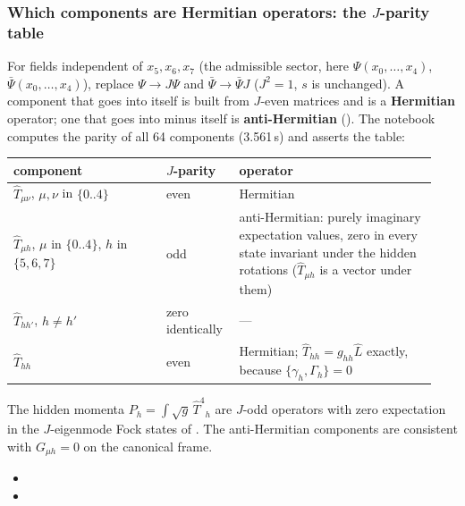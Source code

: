 \subsubsection{Which components are Hermitian operators: the \texorpdfstring{$J$}{J}-parity table}
\label{sec:3.6.5}

For fields independent of $x_5,x_6,x_7$ (the admissible sector, here $\Psi(x_0,\dots,x_4)$,
$\bar\Psi(x_0,\dots,x_4)$), replace $\Psi\to J\Psi$ and $\bar\Psi\to\bar\Psi J$ ($J^2=1$, $s$ is
unchanged). A component that goes into itself is built from $J$-even matrices and is a
\textbf{Hermitian} operator; one that goes into minus itself is \textbf{anti-Hermitian}
(). The notebook computes the parity of all 64 components (3.561\,s) and asserts the
table:

{\small
\begin{longtable}{@{}p{0.34\linewidth}p{0.16\linewidth}p{0.44\linewidth}@{}}
\toprule
\raggedright component & \raggedright $J$-parity & \raggedright operator \tabularnewline
\midrule
\endhead
\raggedright $\hat T_{\mu\nu}$, $\mu,\nu$ in $\{0..4\}$ & \raggedright even & \raggedright Hermitian \tabularnewline
\raggedright $\hat T_{\mu h}$, $\mu$ in $\{0..4\}$, $h$ in $\{5,6,7\}$ & \raggedright odd & \raggedright anti-Hermitian: purely imaginary expectation values, zero in every state invariant under the hidden rotations ($\hat T_{\mu h}$ is a vector under them) \tabularnewline
\raggedright $\hat T_{hh'}$, $h\neq h'$ & \raggedright zero identically & \raggedright --- \tabularnewline
\raggedright $\hat T_{hh}$ & \raggedright even & \raggedright Hermitian; $\hat T_{hh}=g_{hh}\hat L$ exactly, because $\{\gamma_h,\Gamma_h\}=0$ \tabularnewline
\bottomrule
\end{longtable}
}

The hidden momenta $P_h=\int\sqrt g\,\hat T^4{}_h$ are $J$-odd operators with zero expectation in the
$J$-eigenmode Fock states of  . The anti-Hermitian components are
consistent with $G_{\mu h}=0$ on the canonical frame. 
\begin{itemize}
  \item {}
  \item {}
\end{itemize}

